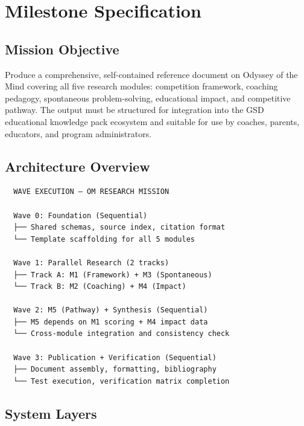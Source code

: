 \documentclass[11pt,letterpaper]{article}
\newcommand{\stageheader}[2]{%
  \noindent\colorbox{#2}{\makebox[\textwidth][l]{%
    \textcolor{white}{\bfseries\sffamily\hspace{6pt}#1\hspace{6pt}}}}%
  \vspace{0.5em}\par%
}
\begin{document}
\newpage

\stageheader{STAGE 3 --- MISSION PACKAGE}{tertiary}

\section{Milestone Specification}

\subsection{Mission Objective}

Produce a comprehensive, self-contained reference document on Odyssey of the Mind covering all five research modules: competition framework, coaching pedagogy, spontaneous problem-solving, educational impact, and competitive pathway. The output must be structured for integration into the GSD educational knowledge pack ecosystem and suitable for use by coaches, parents, educators, and program administrators.

\subsection{Architecture Overview}

\begin{asciibox}
\begin{verbatim}
  WAVE EXECUTION — OM RESEARCH MISSION

  Wave 0: Foundation (Sequential)
  ├── Shared schemas, source index, citation format
  └── Template scaffolding for all 5 modules

  Wave 1: Parallel Research (2 tracks)
  ├── Track A: M1 (Framework) + M3 (Spontaneous)
  └── Track B: M2 (Coaching) + M4 (Impact)

  Wave 2: M5 (Pathway) + Synthesis (Sequential)
  ├── M5 depends on M1 scoring + M4 impact data
  └── Cross-module integration and consistency check

  Wave 3: Publication + Verification (Sequential)
  ├── Document assembly, formatting, bibliography
  └── Test execution, verification matrix completion
\end{verbatim}
\end{asciibox}

\subsection{System Layers}
\end{document}
